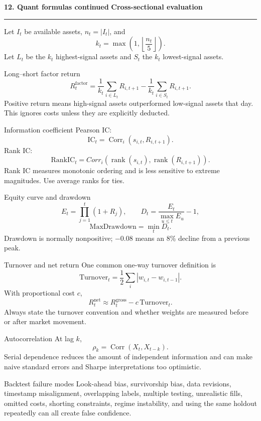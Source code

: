 \documentclass[10pt,a4paper]{article}
\newcommand{\sectionbanner}[2]{%
  \vspace{2mm}
  {\color{navy}\Large\bfseries #1}\hfill
  {\color{blue}\bfseries #2}
  \par\vspace{1mm}\color{line}\rule{\linewidth}{0.8pt}\color{ink}\vspace{2mm}
}
\newcommand{\Corr}{\operatorname{Corr}}
\begin{document}
\sectionbanner{12. Quant formulas continued}{Cross-sectional evaluation}

Let $I_t$ be available assets, $n_t=|I_t|$, and
\[
k_t=\max\left(1,\left\lfloor\frac{n_t}{5}\right\rfloor\right).
\]
Let $L_t$ be the $k_t$ highest-signal assets and $S_t$ the $k_t$ lowest-signal assets.

\begin{formulabox}{Long--short factor return}
\[
R_t^{\mathrm{factor}}
=\frac1{k_t}\sum_{i\in L_t}R_{i,t+1}
-\frac1{k_t}\sum_{i\in S_t}R_{i,t+1}.
\]
Positive return means high-signal assets outperformed low-signal assets that day. This ignores costs unless they are explicitly deducted.
\end{formulabox}

\begin{formulabox}{Information coefficient}
Pearson IC:
\[
\mathrm{IC}_t=\Corr_i(s_{i,t},R_{i,t+1}).
\]
Rank IC:
\[
\mathrm{RankIC}_t=Corr_i(\operatorname{rank}(s_{i,t}),
\operatorname{rank}(R_{i,t+1})).
\]
Rank IC measures monotonic ordering and is less sensitive to extreme magnitudes. Use average ranks for ties.
\end{formulabox}

\begin{formulabox}{Equity curve and drawdown}
\[
E_t=\prod_{j=1}^{t}(1+R_j),
\qquad
D_t=\frac{E_t}{\max_{u\le t}E_u}-1,
\]
\[
\mathrm{MaxDrawdown}=\min_t D_t.
\]
Drawdown is normally nonpositive; $-0.08$ means an 8\% decline from a previous peak.
\end{formulabox}

\begin{formulabox}{Turnover and net return}
One common one-way turnover definition is
\[
\mathrm{Turnover}_t=\frac12\sum_i|w_{i,t}-w_{i,t-1}|.
\]
With proportional cost $c$,
\[
R_t^{\mathrm{net}}\approx R_t^{\mathrm{gross}}-c\,\mathrm{Turnover}_t.
\]
Always state the turnover convention and whether weights are measured before or after market movement.
\end{formulabox}

\begin{formulabox}{Autocorrelation}
At lag $k$,
\[
\rho_k=\Corr(X_t,X_{t-k}).
\]
Serial dependence reduces the amount of independent information and can make naive standard errors and Sharpe interpretations too optimistic.
\end{formulabox}

\begin{trapbox}{Backtest failure modes}
Look-ahead bias, survivorship bias, data revisions, timestamp misalignment, overlapping labels, multiple testing, unrealistic fills, omitted costs, shorting constraints, regime instability, and using the same holdout repeatedly can all create false confidence.
\end{trapbox}
\end{document}
